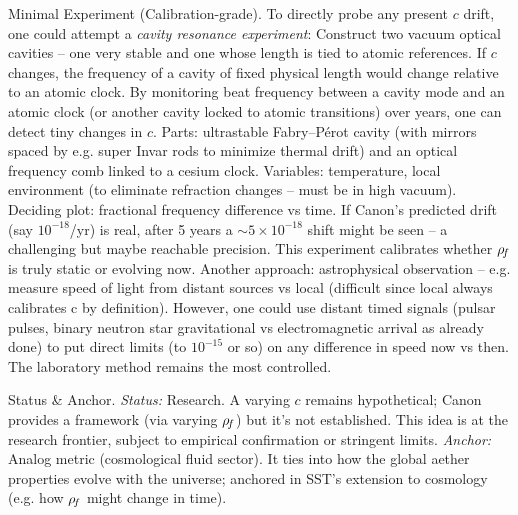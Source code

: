 \documentclass[11pt]{article}
\begin{document}
Minimal Experiment (Calibration-grade). To directly probe any present $c$ drift, one could attempt a \textit{cavity resonance experiment}: Construct two vacuum optical cavities – one very stable and one whose length is tied to atomic references. If $c$ changes, the frequency of a cavity of fixed physical length would change relative to an atomic clock. By monitoring beat frequency between a cavity mode and an atomic clock (or another cavity locked to atomic transitions) over years, one can detect tiny changes in $c$. Parts: ultrastable Fabry–Pérot cavity (with mirrors spaced by e.g. super Invar rods to minimize thermal drift) and an optical frequency comb linked to a cesium clock. Variables: temperature, local environment (to eliminate refraction changes – must be in high vacuum). Deciding plot: fractional frequency difference vs time. If Canon’s predicted drift (say $10^{-18}$/yr) is real, after 5 years a $\sim5\times10^{-18}$ shift might be seen – a challenging but maybe reachable precision. This experiment calibrates whether $\rho_{\!f}$ is truly static or evolving now. Another approach: astrophysical observation – e.g. measure speed of light from distant sources vs local (difficult since local always calibrates c by definition). However, one could use distant timed signals (pulsar pulses, binary neutron star gravitational vs electromagnetic arrival as already done) to put direct limits (to $10^{-15}$ or so) on any difference in speed now vs then. The laboratory method remains the most controlled.


Status & Anchor. \textit{Status:} Research. A varying $c$ remains hypothetical; Canon provides a framework (via varying $\rho_{\!f}$) but it’s not established. This idea is at the research frontier, subject to empirical confirmation or stringent limits. \textit{Anchor:} Analog metric (cosmological fluid sector). It ties into how the global aether properties evolve with the universe; anchored in SST’s extension to cosmology (e.g. how $\rho_{\!f}$ might change in time).
\end{document}
